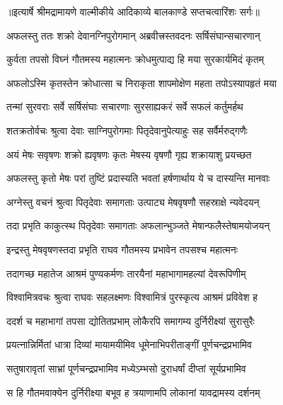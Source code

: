 {॥इत्यार्षे श्रीमद्रामायणे वाल्मीकीये आदिकाव्ये बालकाण्डे सप्तचत्वारिंशः सर्गः॥}


\twolineshloka
{अफलस्तु ततः शक्रो देवानग्निपुरोगमान्}
{अब्रवीत्त्रस्तवदनः सर्षिसंघान्सचारणान्} %

\twolineshloka
{कुर्वता तपसो विघ्नं गौतमस्य महात्मनः}
{क्रोधमुत्पाद्य हि मया सुरकार्यमिदं कृतम्} %

\twolineshloka
{अफलोऽस्मि कृतस्तेन क्रोधात्सा च निराकृता}
{शापमोक्षेण महता तपोऽस्यापहृतं मया} %

\twolineshloka
{तन्मां सुरवराः सर्वे सर्षिसंघाः सचारणाः}
{सुरसाह्यकरं सर्वे सफलं कर्तुमर्हथ} %

\twolineshloka
{शतक्रतोर्वचः श्रुत्वा देवाः साग्निपुरोगमाः}
{पितृदेवानुपेत्याहुः सह सर्वैर्मरुद्गणैः} %

\twolineshloka
{अयं मेषः सवृषणः शक्रो ह्यवृषणः कृतः}
{मेषस्य वृषणौ गृह्य शक्रायाशु प्रयच्छत} %

\twolineshloka
{अफलस्तु कृतो मेषः परां तुष्टिं प्रदास्यति}
{भवतां हर्षणार्थाय ये च दास्यन्ति मानवाः} %

\twolineshloka
{अग्नेस्तु वचनं श्रुत्वा पितृदेवाः समागताः}
{उत्पाट्य मेषवृषणौ सहस्राक्षे न्यवेदयन्} %

\twolineshloka
{तदा प्रभृति काकुत्स्थ पितृदेवाः समागताः}
{अफलान्भुञ्जते मेषान्फलैस्तेषामयोजयन्} %

\twolineshloka
{इन्द्रस्तु मेषवृषणस्तदा प्रभृति राघव}
{गौतमस्य प्रभावेन तपसश्च महात्मनः} %

\twolineshloka
{तदागच्छ महातेज आश्रमं पुण्यकर्मणः}
{तारयैनां महाभागामहल्यां देवरूपिणीम्} %

\twolineshloka
{विश्वामित्रवचः श्रुत्वा राघवः सहलक्ष्मणः}
{विश्वामित्रं पुरस्कृत्य आश्रमं प्रविवेश ह} %

\twolineshloka
{ददर्श च महाभागां तपसा द्योतितप्रभाम्}
{लोकैरपि समागम्य दुर्निरीक्ष्यां सुरासुरैः} %

\twolineshloka
{प्रयत्नान्निर्मितां धात्रा दिव्यां मायामयीमिव}
{धूमेनाभिपरीताङ्गीं पूर्णचन्द्रप्रभामिव} %

\twolineshloka
{सतुषारावृतां साभ्रां पूर्णचन्द्रप्रभामिव}
{मध्येऽम्भसो दुराधर्षां दीप्तां सूर्यप्रभामिव} %

\twolineshloka
{स हि गौतमवाक्येन दुर्निरीक्ष्या बभूव ह}
{त्रयाणामपि लोकानां यावद्रामस्य दर्शनम्} %

